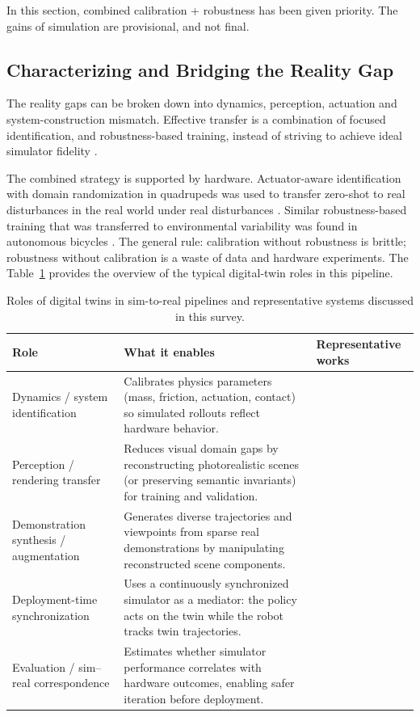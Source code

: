 \documentclass[11pt,a4paper]{article}
\begin{document}
In this section, combined calibration + robustness has been given priority. The gains of simulation are provisional, and not final.

\subsection{Characterizing and Bridging the Reality Gap}

The reality gaps can be broken down into dynamics, perception, actuation and system-construction mismatch. Effective transfer is a combination of focused identification, and robustness-based training, instead of striving to achieve ideal simulator fidelity \cite{aljalbout2026realitygap}.

The combined strategy is supported by hardware. Actuator-aware identification with domain randomization in quadrupeds was used to transfer zero-shot to real disturbances in the real world under real disturbances \cite{tan2018simtoreal}. Similar robustness-based training that was transferred to environmental variability was found in autonomous bicycles \cite{liu2024cyclerl}. The general rule: calibration without robustness is brittle; robustness without calibration is a waste of data and hardware experiments. The Table~\ref{tab:digital_twin_roles} provides the overview of the typical digital-twin roles in this pipeline.

\begin{table}[t]
\centering
\caption{Roles of digital twins in sim-to-real pipelines and representative systems discussed in this survey.}
\label{tab:digital_twin_roles}
\renewcommand{\arraystretch}{1.15}
\footnotesize
\begin{tabularx}{\textwidth}{@{}p{3.1cm}X p{6.0cm}@{}}
\toprule
Role & What it enables & Representative works \\
\midrule
Dynamics / system identification & Calibrates physics parameters (mass, friction, actuation, contact) so simulated rollouts reflect hardware behavior. & \cite{tan2018simtoreal, heiden2022inferring, lou2026drex} \\
Perception / rendering transfer & Reduces visual domain gaps by reconstructing photorealistic scenes (or preserving semantic invariants) for training and validation. & \cite{qureshi2025splatsim, tang2025semantic} \\
Demonstration synthesis / augmentation & Generates diverse trajectories and viewpoints from sparse real demonstrations by manipulating reconstructed scene components. & \cite{yang2025robosplat, yu2025real2render2real} \\
Deployment-time synchronization & Uses a continuously synchronized simulator as a mediator: the policy acts on the twin while the robot tracks twin trajectories. & \cite{abou2024realissim} \\
Evaluation / sim--real correspondence & Estimates whether simulator performance correlates with hardware outcomes, enabling safer iteration before deployment. & \cite{jain2025polaris, li2024simpler} \\
\bottomrule
\end{tabularx}
\end{table}
\end{document}
